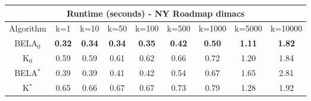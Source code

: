 \begin{tabular}{c|cccccccc}\toprule
\multicolumn{9}{c}{Runtime (seconds) - NY Roadmap dimacs}\\ \midrule
Algorithm & k=1 & k=10 & k=50 & k=100 & k=500 & k=1000 & k=5000 & k=10000 \\ \midrule
BELA$_0$ & \textbf{0.32} & \textbf{0.34} & \textbf{0.34} & \textbf{0.35} & \textbf{0.42} & \textbf{0.50} & \textbf{1.11} & \textbf{1.82} \\
K$_0$ & 0.59 & 0.59 & 0.61 & 0.62 & 0.66 & 0.72 & 1.20 & 1.84 \\
BELA$^*$ & 0.39 & 0.39 & 0.41 & 0.42 & 0.54 & 0.67 & 1.65 & 2.81 \\
K$^*$ & 0.65 & 0.66 & 0.67 & 0.67 & 0.73 & 0.79 & 1.28 & 1.92 \\ \bottomrule 
\end{tabular}
